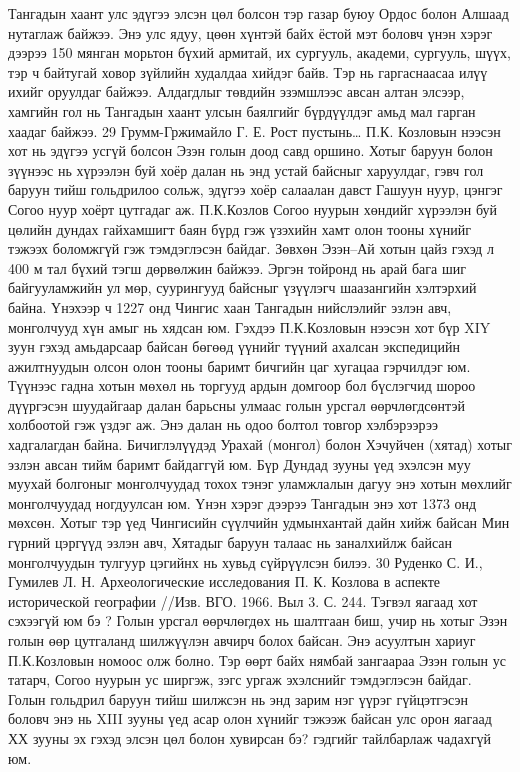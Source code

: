 Тангадын хаант улс эдүгээ элсэн цөл болсон тэр газар буюу Ордос болон Алшаад нутаглаж байжээ. Энэ улс ядуу, цөөн хүнтэй байх ёстой мэт боловч үнэн хэрэг дээрээ 150 мянган морьтон бүхий армитай, их сургууль, академи, сургууль, шүүх, тэр ч байтугай ховор зүйлийн худалдаа хийдэг байв. Тэр нь гаргаснаасаа илүү ихийг оруулдаг байжээ. Алдагдлыг төвдийн эзэмшлээс авсан алтан элсээр, хамгийн гол нь Тангадын хаант улсын баялгийг бүрдүүлдэг амьд мал гарган хаадаг байжээ.
29 Грумм-Гржимайло Г. Е. Рост пустынь…
П.К. Козловын нээсэн хот нь эдүгээ усгүй болсон Эзэн голын доод савд оршино. Хотыг баруун болон зүүнээс нь хүрээлэн буй хоёр далан нь энд устай байсныг харуулдаг, гэвч гол баруун тийш гольдрилоо сольж, эдүгээ хоёр салаалан давст Гашуун нуур, цэнгэг Согоо нуур хоёрт цутгадаг аж. П.К.Козлов Согоо нуурын хөндийг хүрээлэн буй цөлийн дундах гайхамшигт баян бүрд гэж үзэхийн хамт олон тооны хүнийг тэжээх боломжгүй гэж тэмдэглэсэн байдаг. Зөвхөн Эзэн–Ай хотын цайз гэхэд л 400 м тал бүхий тэгш дөрвөлжин байжээ. Эргэн тойронд нь арай бага шиг байгууламжийн ул мөр, суурингууд байсныг үзүүлэгч шаазангийн хэлтэрхий байна. Үнэхээр ч 1227 онд Чингис хаан Тангадын нийслэлийг эзлэн авч, монголчууд хүн амыг нь хядсан юм. Гэхдээ П.К.Козловын нээсэн хот бүр XIY зуун гэхэд амьдарсаар байсан бөгөөд үүнийг түүний ахалсан экспедицийн ажилтнуудын олсон олон тооны баримт бичгийн цаг хугацаа гэрчилдэг юм. Түүнээс гадна хотын мөхөл нь торгууд ардын домгоор бол бүслэгчид шороо дүүргэсэн шуудайгаар далан барьсны улмаас голын урсгал өөрчлөгдсөнтэй холбоотой гэж үздэг аж. Энэ далан нь одоо болтол товгор хэлбэрээрээ хадгалагдан байна. Бичиглэлүүдэд Урахай (монгол) болон Хэчуйчен (хятад) хотыг эзлэн авсан тийм баримт байдаггүй юм. Бүр Дундад зууны үед эхэлсэн муу муухай болгоныг монголчуудад тохох тэнэг уламжлалын дагуу энэ хотын мөхлийг монголчуудад ногдуулсан юм. Үнэн хэрэг дээрээ Тангадын энэ хот 1373 онд мөхсөн. Хотыг тэр үед Чингисийн сүүлчийн удмынхантай дайн хийж байсан Мин гүрний цэргүүд эзлэн авч, Хятадыг баруун талаас нь заналхийлж байсан монголчуудын тулгуур цэгийнх нь хувьд сүйрүүлсэн билээ.
30 Руденко С. И., Гумилев Л. Н. Археологические исследования П. К. Козлова в аспекте исторической географии //Изв. ВГО. 1966. Выл 3. С. 244.
Тэгвэл яагаад хот сэхээгүй юм бэ ? Голын урсгал өөрчлөгдөх нь шалтгаан биш, учир нь хотыг Эзэн голын өөр цутгаланд шилжүүлэн авчирч болох байсан. Энэ асуултын хариуг П.К.Козловын номоос олж болно. Тэр өөрт байх нямбай зангаараа Эзэн голын ус татарч, Согоо нуурын ус ширгэж, зэгс ургаж эхэлснийг тэмдэглэсэн байдаг. Голын гольдрил баруун тийш шилжсэн нь энд зарим нэг үүрэг гүйцэтгэсэн боловч энэ нь XIII зууны үед асар олон хүнийг тэжээж байсан улс орон яагаад ХХ зууны эх гэхэд элсэн цөл болон хувирсан бэ? гэдгийг тайлбарлаж чадахгүй юм.
